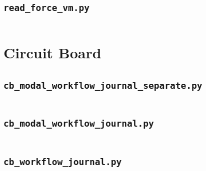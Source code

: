 \documentclass[12pt,report,justified]{SANDreport}
\begin{document}
\subsection{\tt{read\_force\_vm.py}}
\inputminted[stripnl=false]{python}{door_hinge/read_force_vm.py}

\section{Circuit Board}

\subsection{\tt{cb\_modal\_workflow\_journal\_separate.py}}
\inputminted[stripnl=false]{python}{circuit_board/cb_modal_workflow_journal_separate.py}

\subsection{\tt{cb\_modal\_workflow\_journal.py}}
\inputminted[stripnl=false]{python}{circuit_board/cb_modal_workflow_journal.py}

\subsection{\tt{cb\_workflow\_journal.py}}
\inputminted[stripnl=false]{python}{circuit_board/cb_workflow_journal.py}

\end{document}
